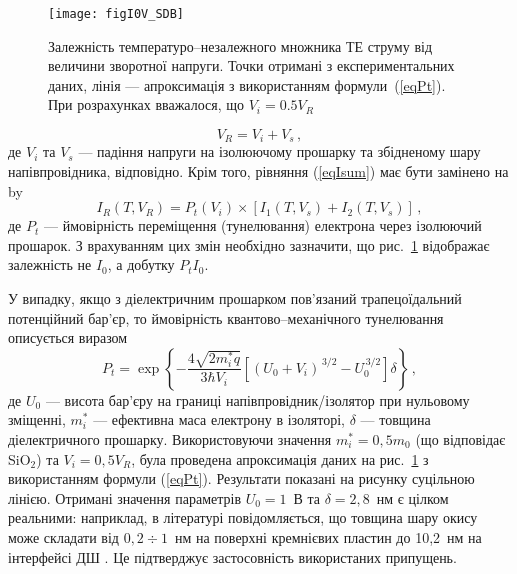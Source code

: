 \begin{figure}
\center
\texttt{[image: figI0V\_SDB]}
\caption{\label{figI0V_SDB}
Залежність температуро--незалежного множника ТЕ струму від величини зворотної напруги.
Точки отримані з експериментальних даних,
лінія --- апроксимація з використанням формули~(\ref{eqPt}).
При розрахунках вважалося, що $V_i=0.5V_R$
}%
\end{figure}


\begin{equation}\label{eqVR}
    V_R=V_i+V_s\,,
\end{equation}
де
$V_i$ та $V_s$ --- падіння напруги на ізолюючому прошарку та збідненому шару напівпровідника, відповідно.
Крім того, рівняння (\ref{eqIsum}) має бути замінено на
 by
\begin{equation}\label{eqIsum2}
    I_R(T,V_R)=P_t(V_i)\times[I_1(T,V_s)+I_2(T,V_s)]\,,
\end{equation}
де
$P_t$ --- ймовірність переміщення (тунелювання) електрона через ізолюючий прошарок.
З врахуванням цих змін необхідно зазначити, що рис.~\ref{figI0V_SDB} відображає залежність не $I_0$,
а добутку $P_tI_0$.

У випадку, якщо з діелектричним прошарком пов'язаний трапецоїдальний потенційний бар'єр,
то ймовірність квантово--механічного тунелювання описується виразом
\begin{equation}\label{eqPt}
    P_t=\exp\left\{-\frac{4\sqrt{2m_i^*q}}{3\hbar V_i}\left[(U_0+V_i)^{\,3/2}-U_0^{\,3/2}\right]\delta\right\}\,,
\end{equation}
де
$U_0$ --- висота бар'єру на границі напівпровідник/ізолятор при нульовому зміщенні,
$m_i^*$ --- ефективна маса електрону в ізоляторі,
$\delta$ --- товщина діелектричного прошарку.
Використовуючи значення $m_i^*=0,5m_0$ (що відповідає SiO$_2$)
та $V_i=0,5V_R$, була проведена апроксимація даних на рис.~\ref{figI0V_SDB} з використанням формули
(\ref{eqPt}).
Результати показані на рисунку суцільною лінією.
Отримані значення параметрів $U_0=1$~В та $\delta=2,8$~нм є цілком реальними: наприклад,
в літературі повідомляється, що товщина шару окису може складати від $0,2\div1$~нм на поверхні кремнієвих пластин \cite{Saito}
до 10,2~нм на інтерфейсі ДШ \cite{SHIWAKOTI2018}.
Це підтверджує застосовність використаних припущень.

